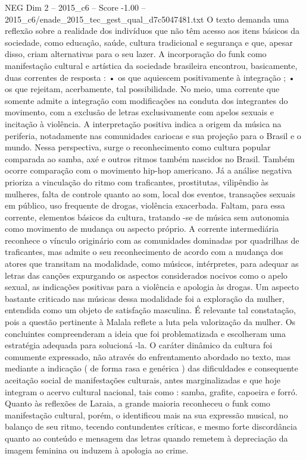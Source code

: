 \begin{textsample}{NEG Dim 2 – 2015\_c6 – Score -1.00 – 2015\_c6/enade\_2015\_tec\_gest\_qual\_d7c5047481.txt}
O texto demanda uma reflexão sobre a realidade dos indivíduos que não têm acesso aos itens básicos da sociedade, como educação, saúde, cultura tradicional e segurança e que, apesar disso, criam alternativas para o seu lazer.
A incorporação do funk como manifestação cultural e artística da sociedade brasileira encontrou, basicamente, duas correntes de resposta : • os que aquiescem positivamente à integração ; • os que rejeitam, acerbamente, tal possibilidade.
No meio, uma corrente que somente admite a integração com modificações na conduta dos integrantes do movimento, com a exclusão de letras exclusivamente com apelos sexuais e incitação à violência.
A interpretação positiva indica a origem da música na periferia, notadamente nas comunidades cariocas e sua projeção para o Brasil e o mundo.
Nessa perspectiva, surge o reconhecimento como cultura popular comparada ao samba, axé e outros ritmos também nascidos no Brasil.
Também ocorre comparação com o movimento hip-hop americano.
Já a análise negativa prioriza a vinculação do ritmo com traficantes, prostitutas, vilipêndio às mulheres, falta de controle quanto ao som, local dos eventos, transações sexuais em público, uso frequente de drogas, violência exacerbada.
Faltam, para essa corrente, elementos básicos da cultura, tratando -se de música sem autonomia como movimento de mudança ou aspecto próprio.
A corrente intermediária reconhece o vínculo originário com as comunidades dominadas por quadrilhas de traficantes, mas admite o seu reconhecimento de acordo com a mudança dos atores que transitam na modalidade, como músicos, intérpretes, para adequar as letras das canções expurgando os aspectos considerados nocivos como o apelo sexual, as indicações positivas para a violência e apologia às drogas.
Um aspecto bastante criticado nas músicas dessa modalidade foi a exploração da mulher, entendida como um objeto de satisfação masculina.
É relevante tal constatação, pois a questão pertinente à Malala reflete a luta pela valorização da mulher.
Os concluintes compreenderam a ideia que foi problematizada e escolheram uma estratégia adequada para solucioná -la.
O caráter dinâmico da cultura foi comumente expressado, não através do enfrentamento abordado no texto, mas mediante a indicação ( de forma rasa e genérica ) das dificuldades e consequente aceitação social de manifestações culturais, antes marginalizadas e que hoje integram o acervo cultural nacional, tais como : samba, grafite, capoeira e forró.
Quanto às reflexões de Laraia, a grande maioria reconheceu o funk como manifestação cultural, porém, o identificou mais na sua expressão musical, no balanço de seu ritmo, tecendo contundentes críticas, e mesmo forte discordância quanto ao conteúdo e mensagem das letras quando remetem à depreciação da imagem feminina ou induzem à apologia ao crime.

\end{textsample}
